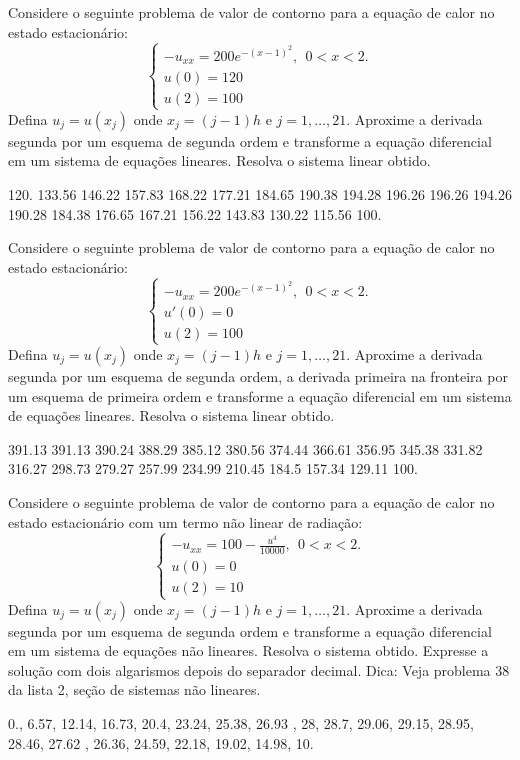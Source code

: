 \begin{exer} Considere o seguinte problema de valor de contorno para a equação de calor no estado estacionário:
$$\left\{\begin{array}{l}-u_{xx}=200e^{-(x-1)^2},~~ 0<x<2.\\
u(0)=120\\
u(2)=100\end{array}
\right.
$$
Defina $u_j=u(x_j)$ onde $x_j={(j-1)}{h}$ e $j=1,\ldots,21$. Aproxime a derivada segunda por um esquema de segunda ordem e transforme a equação diferencial em um sistema de equações lineares. Resolva o sistema linear obtido.
\end{exer}
\begin{resp}
120.    133.56    146.22    157.83    168.22    177.21    184.65    190.38    194.28    196.26    196.26    194.26    190.28    184.38    176.65    167.21  156.22    143.83    130.22    115.56    100.    
\end{resp}

\begin{exer} Considere o seguinte problema de valor de contorno para a equação de calor no estado estacionário:
$$\left\{\begin{array}{l}-u_{xx}=200e^{-(x-1)^2},~~ 0<x<2.\\
u'(0)=0\\
u(2)=100\end{array}
\right.
$$
Defina $u_j=u(x_j)$ onde $x_j={(j-1)}{h}$ e $j=1,\ldots,21$. Aproxime a derivada segunda por um esquema de segunda ordem, a derivada primeira na fronteira por um esquema de primeira ordem e transforme a equação diferencial em um sistema de equações lineares. Resolva o sistema linear obtido.
\end{exer}
\begin{resp}
391.13    391.13    390.24    388.29    385.12    380.56    374.44    366.61    356.95    345.38    331.82    316.27    298.73    279.27    257.99    234.99    210.45    184.5    157.34    129.11    100.    
\end{resp}


\begin{exer} Considere o seguinte problema de valor de contorno para a equação de calor no estado estacionário com um termo não linear de radiação:
$$\left\{\begin{array}{l}-u_{xx}=100- \frac{u^4}{10000},~~ 0<x<2.\\
u(0)=0\\
u(2)=10\end{array}
\right.
$$
Defina $u_j=u(x_j)$ onde $x_j={(j-1)}{h}$ e $j=1,\ldots,21$. Aproxime a derivada segunda por um esquema de segunda ordem e transforme a equação diferencial em um sistema de equações não lineares. Resolva o sistema  obtido. Expresse  a solução com dois algarismos depois do separador decimal. Dica: Veja problema 38 da lista 2, seção de sistemas não lineares.
\end{exer}
\begin{resp}
0.,    6.57,    12.14,    16.73,    20.4,    23.24,    25.38,    26.93 ,   28,    28.7,    29.06,    29.15,    28.95,    28.46, 27.62 ,   26.36,    24.59,    22.18,    19.02,    14.98,    10.    
\end{resp}

